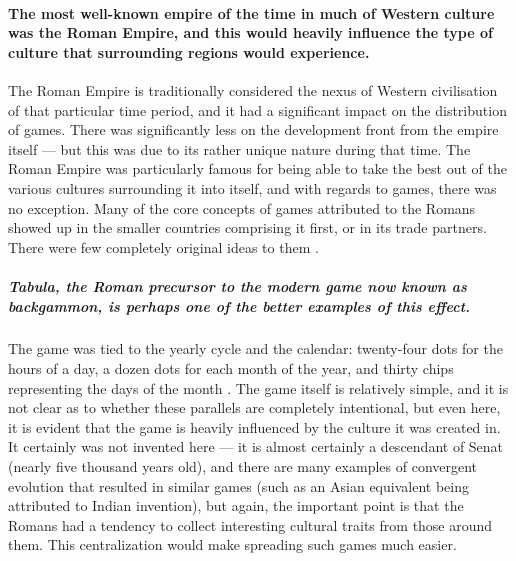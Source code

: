 \paragraph{The most well-known empire of the time in much of Western culture was the Roman Empire, and this would heavily influence the type of culture that surrounding regions would experience.}
The Roman Empire is traditionally considered the nexus of Western civilisation of that particular time period, and it had a significant impact on the distribution of games.
There was significantly less on the development front from the empire itself --- but this was due to its rather unique nature during that time.
The Roman Empire was particularly famous for being able to take the best out of the various cultures surrounding it into itself, and with regards to games, there was no exception.
Many of the core concepts of games attributed to the Romans showed up in the smaller countries comprising it first, or in its trade partners.
There were few completely original ideas to them \citep{armesto2010}.

\subparagraph{Tabula, the Roman precursor to the modern game now known as backgammon, is perhaps one of the better examples of this effect.}
The game was tied to the yearly cycle and the calendar: twenty-four dots for the hours of a day,
a dozen dots for each month of the year, and thirty chips representing the days of the month \citep{botermans2008}.
The game itself is relatively simple, and it is not clear as to whether these parallels are completely intentional,
but even here, it is evident that the game is heavily influenced by the culture it was created in.
It certainly was not invented here --- it is almost certainly a descendant of Senat (nearly five thousand years old),
and there are many examples of convergent evolution that resulted in similar games (such as an Asian equivalent being attributed to Indian invention),
but again, the important point is that the Romans had a tendency to collect interesting cultural traits from those around them.
This centralization would make spreading such games much easier.

